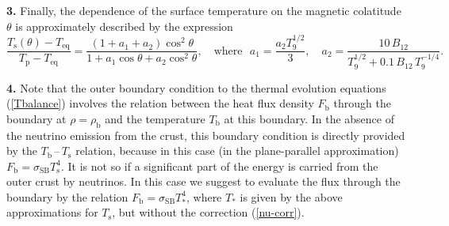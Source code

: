 \documentclass[smallextended]{svjour3}       %
\newcommand{\beq}{\begin{equation}}
\newcommand{\eeq}{\end{equation}}
\newcommand{\rhob}{\rho_\mathrm{b}}
\newcommand{\sSB}{\sigma_\mathrm{SB}}
\newcommand{\Tb}{T_\mathrm{b}}
\newcommand{\TbTs}{$T_\mathrm{b}$\,--\,$T_\mathrm{s}$}
\newcommand{\Ts}{T_\mathrm{s}}
\begin{document}
\begin{appendix}
\textbf{3.}
Finally, the dependence of the surface temperature on the magnetic
colatitude $\theta$ is approximately described by the
expression
\beq
      \frac{\Ts(\theta)-T_\mathrm{eq}}{T_\mathrm{p}-T_\mathrm{eq}}
         = \frac{(1+a_1+a_2) \cos^2\theta}{
            1+a_1\cos\theta+a_2\cos^2\theta},
\quad\mbox{where~~}
      a_1=\frac{a_2 T_9^{1/2}}{3},
\quad
   a_2  =
     \frac{ 10\,B_{12}}{
      T_9^{1/2} +
0.1\,B_{12}\,T_9^{-1/4}}.
\eeq

\textbf{4.}
Note that the outer boundary condition to the thermal evolution
equations (\ref{Tbalance}) involves the
relation between the heat flux density $F_\mathrm{b}$ through the
boundary at $\rho=\rhob$ and the temperature $\Tb$ at this
boundary. In the absence of the neutrino emission from the
crust, this boundary condition is directly provided by the
\TbTs{} relation, because in this case (in the
plane-parallel approximation) $F_\mathrm{b}=\sSB\Ts^4$. It
is not so if a significant part of the energy is
carried from the outer crust by neutrinos. In this case we
suggest to evaluate the flux through the boundary by the
relation $F_\mathrm{b}=\sSB T_\ast^4$, where
$T_\ast$ is given by the above approximations for $\Ts$,
but without the correction (\ref{nu-corr}).


\end{appendix}

\newcommand{\artref}[4]{{#1} {#2}, #3 (#4)}
\newcommand{\AandA}[3]{\artref{Astron.\ Astrophys.}{#1}{#2}{#3}}
\newcommand{\AIPC}[3]{\artref{AIP Conf.\ Proc.}{#1}{#2}{#3}}
\newcommand{\AnnPhysNY}[3]{\artref{Ann.\ Phys. (N.Y.)}{#1}{#2}{#3}}
\newcommand{\ApJ}[3]{\artref{Astrophys.\ J.}{#1}{#2}{#3}}
\newcommand{\ApJS}[3]{\artref{Astrophys.\ J.\ Suppl.\ Ser.}{#1}{#2}{#3}}
\newcommand{\ApSS}[3]{\artref{Astrophys.\ Space Sci.}{#1}{#2}{#3}}
\newcommand{\ARAA}[3]{\artref{Annu.\ Rev.\ Astron.\ Astrophys.}{#1}{#2}{#3}}
\newcommand{\AL}[3]{\artref{Astron.\ Lett.}{#1}{#2}{#3}}
\newcommand{\JPB}[3]{\artref{J.\ Phys.\ B: At.\ Mol.\ Opt.\ Phys.}{#1}{#2}{#3}}
\newcommand{\jpb}[3]{\artref{J.\ Phys.\ B: At.\ Mol.\ Phys.}{#1}{#2}{#3}}
\newcommand{\MNRAS}[3]{\artref{Mon.\ Not.\ R.\ Astron.\ Soc.}{#1}{#2}{#3}}
\newcommand{\NPA}[3]{\artref{Nucl.\ Phys.\ A}{#1}{#2}{#3}}
\newcommand{\PL}[4]{\artref{Phys.\ Lett. #1}{#2}{#3}{#4}}
\newcommand{\PR}[4]{\artref{Phys.\ Rev. #1}{#2}{#3}{#4}}
\newcommand{\PRL}[3]{\artref{Phys.\ Rev.\ Lett.}{#1}{#2}{#3}}
\newcommand{\RMP}[3]{\artref{Rev.\ Mod.\ Phys.}{#1}{#2}{#3}}
\newcommand{\SSRv}[3]{\artref{Space Sci.\ Rev.}{#1}{#2}{#3}}
\newcommand{\SvAL}[3]{\artref{Sov.\ Astron.\ Lett.}{#1}{#2}{#3}}
\newcommand{\SvA}[3]{\artref{Sov.\ Astron.}{#1}{#2}{#3}}
\end{document}
